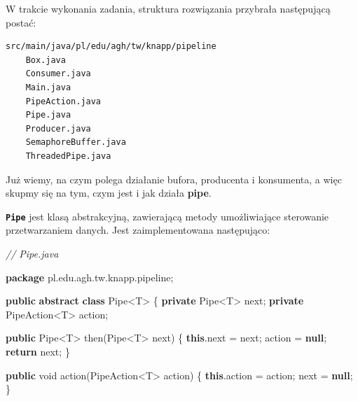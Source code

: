 \documentclass[11pt]{article}
\newenvironment{Shaded}{}{}
\newcommand{\KeywordTok}[1]{\textcolor[rgb]{0.00,0.44,0.13}{\textbf{{#1}}}}
\newcommand{\DataTypeTok}[1]{\textcolor[rgb]{0.56,0.13,0.00}{{#1}}}
\newcommand{\CommentTok}[1]{\textcolor[rgb]{0.38,0.63,0.69}{\textit{{#1}}}}
\newcommand{\FunctionTok}[1]{\textcolor[rgb]{0.02,0.16,0.49}{{#1}}}
\newcommand{\NormalTok}[1]{{#1}}
\newcommand{\ImportTok}[1]{{#1}}
\newcommand{\ControlFlowTok}[1]{\textcolor[rgb]{0.00,0.44,0.13}{\textbf{{#1}}}}
\newcommand{\OperatorTok}[1]{\textcolor[rgb]{0.40,0.40,0.40}{{#1}}}
\newcommand{\BuiltInTok}[1]{{#1}}
\begin{document}
W trakcie wykonania zadania, struktura rozwiązania przybrała następującą
postać:

\begin{verbatim}
src/main/java/pl/edu/agh/tw/knapp/pipeline
    Box.java
    Consumer.java
    Main.java
    PipeAction.java
    Pipe.java
    Producer.java
    SemaphoreBuffer.java
    ThreadedPipe.java
\end{verbatim}

Już wiemy, na czym polega działanie bufora, producenta i konsumenta, a
więc skupmy się na tym, czym jest i jak działa \textbf{pipe}.

    \textbf{\texttt{Pipe}} jest klasą abstrakcyjną, zawierającą metody
umożliwiające sterowanie przetwarzaniem danych. Jest zaimplementowana
następująco:

\begin{Shaded}
\begin{Highlighting}[]
\CommentTok{// Pipe.java}

\KeywordTok{package}\ImportTok{ pl}\OperatorTok{.}\ImportTok{edu}\OperatorTok{.}\ImportTok{agh}\OperatorTok{.}\ImportTok{tw}\OperatorTok{.}\ImportTok{knapp}\OperatorTok{.}\ImportTok{pipeline}\OperatorTok{;}

\KeywordTok{public} \KeywordTok{abstract} \KeywordTok{class} \BuiltInTok{Pipe}\OperatorTok{\textless{}}\NormalTok{T}\OperatorTok{\textgreater{}} \OperatorTok{\{}
    \KeywordTok{private} \BuiltInTok{Pipe}\OperatorTok{\textless{}}\NormalTok{T}\OperatorTok{\textgreater{}}\NormalTok{ next}\OperatorTok{;}
    \KeywordTok{private}\NormalTok{ PipeAction}\OperatorTok{\textless{}}\NormalTok{T}\OperatorTok{\textgreater{}}\NormalTok{ action}\OperatorTok{;}

    \KeywordTok{public} \BuiltInTok{Pipe}\OperatorTok{\textless{}}\NormalTok{T}\OperatorTok{\textgreater{}} \FunctionTok{then}\OperatorTok{(}\BuiltInTok{Pipe}\OperatorTok{\textless{}}\NormalTok{T}\OperatorTok{\textgreater{}}\NormalTok{ next}\OperatorTok{)} \OperatorTok{\{}
        \KeywordTok{this}\OperatorTok{.}\FunctionTok{next} \OperatorTok{=}\NormalTok{ next}\OperatorTok{;}
\NormalTok{        action }\OperatorTok{=} \KeywordTok{null}\OperatorTok{;}
        \ControlFlowTok{return}\NormalTok{ next}\OperatorTok{;}
    \OperatorTok{\}}

    \KeywordTok{public} \DataTypeTok{void} \FunctionTok{action}\OperatorTok{(}\NormalTok{PipeAction}\OperatorTok{\textless{}}\NormalTok{T}\OperatorTok{\textgreater{}}\NormalTok{ action}\OperatorTok{)} \OperatorTok{\{}
        \KeywordTok{this}\OperatorTok{.}\FunctionTok{action} \OperatorTok{=}\NormalTok{ action}\OperatorTok{;}
\NormalTok{        next }\OperatorTok{=} \KeywordTok{null}\OperatorTok{;}
    \OperatorTok{\}}


\end{Highlighting}
\end{Shaded}
\end{document}
